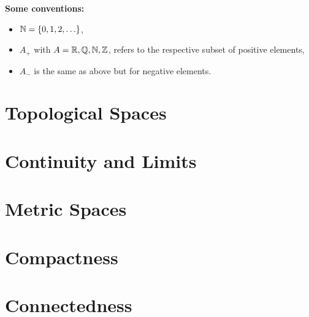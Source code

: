 \documentclass[12pt]{article}
\begin{document}
\maketitle
\tableofcontents
\newpage
\textbf{Some conventions:} 
\begin{itemize}
    \item $\mathbb{N} = \{0,1,2, \ldots \}$,
    \item $A_+$ with $A = \mathbb{R}, \mathbb{Q}, \mathbb{N}, \mathbb{Z}$, refers to the respective subset of positive elements,
    \item $A_-$ is the same as above but for negative elements. 
\end{itemize}
\section{Topological Spaces}

\section{Continuity and Limits}

\section{Metric Spaces}

\section{Compactness}

\section{Connectedness}

\end{document}
